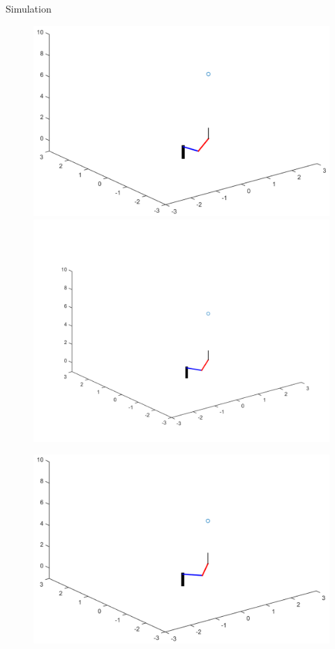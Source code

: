 \documentclass[a4paper,11pt]{article}
\begin{document}
\begin{section}{Simulation}
\begin{figure}[!htb]
   \begin{minipage}{0.4\textwidth}
     \centering
     \includegraphics[width=1.25\linewidth]{FIG3.png}
   \end{minipage}\hfill
   \begin{minipage}{0.4\textwidth}
     \centering
     \includegraphics[width=1.25\linewidth]{FIG4.png}
   \end{minipage}
\end{figure}
\newpage
\begin{figure}[!htb]
   \begin{minipage}{0.4\textwidth}
     \centering
     \includegraphics[width=1.25\linewidth]{FIG5.png}

\end{minipage}
\end{figure}
\end{section}
\end{document}
